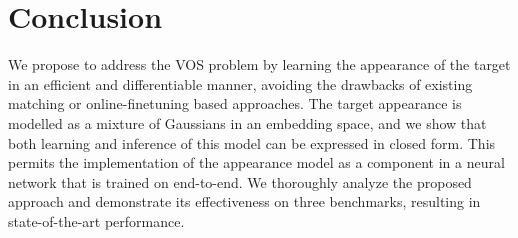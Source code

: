 \documentclass[10pt,twocolumn,letterpaper]{article}
\begin{document}
 \section{Conclusion}
We propose to address the VOS problem by learning the appearance of the target in an efficient and differentiable manner, avoiding the drawbacks of existing matching or online-finetuning based approaches. The target appearance is modelled as a mixture of Gaussians in an embedding space, and we show that both learning and inference of this model can be expressed in closed form. This permits the implementation of the appearance model as a component in a neural network that is trained on end-to-end. We thoroughly analyze the proposed approach and demonstrate its effectiveness on three benchmarks, resulting in state-of-the-art performance.

 
{\small


}
\end{document}
